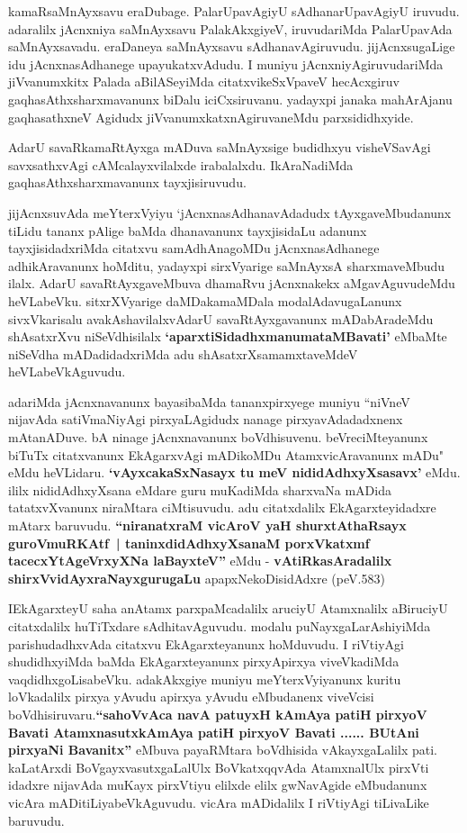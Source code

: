 \begin{artha}
kamaRsaMnAyxsavu eraDubage. PalarUpavAgiyU sAdhanarUpavAgiyU
iruvudu. adaralilx jAcnxniya saMnAyxsavu PalakAkxgiyeV, iruvudariMda
PalarUpavAda saMnAyxsavadu. eraDaneya saMnAyxsavu
sAdhanavAgiruvudu. jijAcnxsugaLige idu jAcnxnasAdhanege
upayukatxvAdudu. I muniyu jAcnxniyAgiruvudariMda jiVvanumxkitx Palada aBilASeyiMda citatxvikeSxVpaveV hecAcxgiruv gaqhasAthxsharxmavanunx biDalu iciCxsiruvanu. yadayxpi janaka mahArAjanu gaqhasathxneV Agidudx
jiVvanumxkatxnAgiruvaneMdu parxsididhxyide. 

AdarU savaRkamaRtAyxga mADuva saMnAyxsige budidhxyu visheVSavAgi
savxsathxvAgi cAMcalayxvilalxde irabalalxdu. IkAraNadiMda
gaqhasAthxsharxmavanunx tayxjisiruvudu.

jijAcnxsuvAda meYterxVyiyu `jAcnxnasAdhanavAdadudx tAyxgaveMbudanunx
tiLidu tananx pAlige baMda dhanavanunx tayxjisidaLu adanunx
tayxjisidadxriMda citatxvu samAdhAnagoMDu jAcnxnasAdhanege
adhikAravanunx hoMditu, yadayxpi sirxVyarige saMnAyxsA sharxmaveMbudu
ilalx. AdarU savaRtAyxgaveMbuva dhamaRvu jAcnxnakekx aMgavAguvudeMdu
heVLabeVku. sitxrXVyarige daMDakamaMDala modalAdavugaLanunx
sivxVkarisalu avakAshavilalxvAdarU savaRtAyxgavanunx mADabAradeMdu
shAsatxrXvu niSeVdhisilalx \textbf{`aparxtiSidadhxmanumataMBavati'} eMbaMte niSeVdha mADadidadxriMda
adu shAsatxrXsamamxtaveMdeV heVLabeVkAguvudu.

adariMda  jAcnxnavanunx bayasibaMda tananxpirxyege muniyu ``niVneV nijavAda satiVmaNiyAgi pirxyaLAgidudx nanage
pirxyavAdadadxnenx mAtanADuve. bA ninage jAcnxnavanunx
boVdhisuvenu. beVreciMteyanunx biTuTx citatxvanunx EkAgarxvAgi
mADikoMDu AtamxvicAravanunx mADu" eMdu heVLidaru. \textbf{`vAyxcakaSxNasayx tu meV nididAdhxyXsasavx'} eMdu. ililx
nididAdhxyXsana eMdare guru muKadiMda sharxvaNa mADida tatatxvXvanunx
niraMtara ciMtisuvudu. adu citatxdalilx EkAgarxteyidadxre mAtarx
baruvudu. \textbf{``niranatxraM vicAroV yaH shurxtAthaRsayx guroVmuRKAtf~| taninxdidAdhxyXsanaM porxVkatxmf tacecxYtAgeVrxyXNa laBayxteV''} eMdu - \textbf{vAtiRkasAradalilx}\textbf{ shirxVvidAyxraNayxgurugaLu} 
apapxNekoDisidAdxre (peV.583)
\end{artha}

\begin{artha}
IEkAgarxteyU saha anAtamx parxpaMcadalilx aruciyU Atamxnalilx
aBiruciyU citatxdalilx huTiTxdare sAdhitavAguvudu. modalu
puNayxgaLarAshiyiMda parishudadhxvAda citatxvu EkAgarxteyanunx
hoMduvudu. I riVtiyAgi shudidhxyiMda baMda EkAgarxteyanunx
pirxyApirxya viveVkadiMda vaqdidhxgoLisabeVku. adakAkxgiye muniyu
meYterxVyiyanunx kuritu loVkadalilx pirxya yAvudu apirxya yAvudu
eMbudanenx viveVcisi boVdhisiruvaru.\textbf{``sahoVvAca navA patuyxH kAmAya patiH pirxyoV Bavati AtamxnasutxkAmAya patiH pirxyoV Bavati ...... BUtAni pirxyaNi Bavanitx''} eMbuva payaRMtara
boVdhisida vAkayxgaLalilx pati. kaLatArxdi BoVgayxvasutxgaLalUlx
BoVkatxqqvAda AtamxnalUlx pirxVti idadxre nijavAda muKayx pirxVtiyu
elilxde elilx gwNavAgide eMbudanunx vicAra
mADitiLiyabeVkAguvudu. vicAra mADidalilx I riVtiyAgi tiLivaLike baruvudu.
\end{artha}

